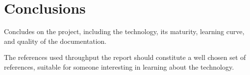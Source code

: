 \section{Conclusions}
\label{sec:conclusion}

Concludes on the project, including the technology, its maturity,
learning curve, and quality of the documentation.

The references used throughput the report should constitute a well
chosen set of references, suitable for someone interesting in learning
about the technology.
